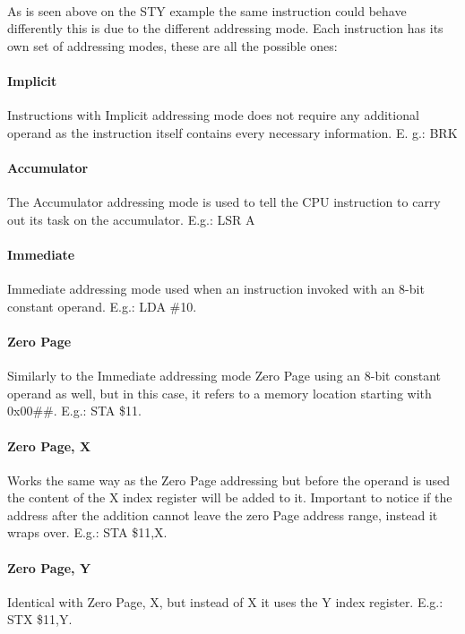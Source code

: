 \documentclass[]{report}
\begin{document}
\paragraph{ }
As is seen above on the STY example the same instruction could behave differently this is due to the different addressing mode. Each instruction has its own set of addressing modes,  these are all the possible ones: 

\paragraph{Implicit}
Instructions with Implicit addressing mode does not require any additional operand as the instruction itself contains every necessary information. E. g.: BRK

\paragraph{Accumulator}
The Accumulator addressing mode is used to tell the CPU instruction to carry out its task on the accumulator. E.g.: LSR A

\paragraph{Immediate}
Immediate addressing mode used when an instruction invoked with an 8-bit constant operand. E.g.: LDA \#10.

\paragraph{Zero Page}
Similarly to the Immediate addressing mode Zero Page using an 8-bit constant operand as well, but in this case, it refers to a memory location starting with 0x00\#\#. E.g.: STA \$11.

\paragraph{Zero Page, X}
Works the same way as the Zero Page addressing but before the operand is used the content of the X index register will be added to it. Important to notice if the address after the addition cannot leave the zero Page address range, instead it wraps over. E.g.: STA \$11,X.

\paragraph{Zero Page, Y}
Identical with Zero Page, X, but instead of X it uses the Y index register. E.g.: STX \$11,Y.
\end{document}
